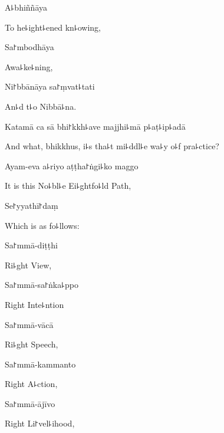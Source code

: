 A꜕bhiññāya

\begin{english}
  To he꜕ight꜕ened kn꜕owing,
\end{english}

Sa꜓mbodhāya

\begin{english}
  Awa꜕ke꜕ning,
\end{english}

Ni꜓bbānāya sa꜓ṃvat꜕tati

\begin{english}
  An꜕d t꜕o Nibbā꜕na.
\end{english}

Katamā ca sā bhi꜓kkh꜕ave majjhi꜕mā p꜕aṭ꜕ip꜕adā

\begin{english}
  And what, bhikkhus, i꜕s tha꜕t mi꜕ddl꜕e wa꜕y o꜕f pra꜕ctice?
\end{english}

Ayam-eva a꜕riyo aṭṭha꜓ṅgi꜕ko maggo

\begin{english}
  It is this No꜕bl꜕e Ei꜕ghtfo꜕ld Path,
\end{english}

Se꜓yyathī꜓daṃ

\begin{english}
  Which is as fo꜕llows:
\end{english}

Sa꜓mmā-diṭṭhi

\begin{english}
  Ri꜕ght View,
\end{english}

Sa꜓mmā-sa꜓ṅka꜕ppo

\begin{english}
  Right Inte꜕ntion
\end{english}

Sa꜓mmā-vācā

\begin{english}
  Ri꜕ght Speech,
\end{english}

Sa꜓mmā-kammanto

\begin{english}
  Right A꜕ction,
\end{english}

Sa꜓mmā-ājīvo

\begin{english}
  Right Li꜓vel꜕ihood,
\end{english}

